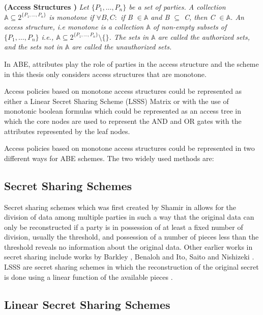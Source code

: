 \begin{definition}{\textbf{(Access Structures \cite{Beimel1996})}}
	\textit{Let $\{P_{1},\ldots,P_{n}\}$ be a set of parties. A collection $ \mathbb{A} \subseteq 2^{\{P_{1},\ldots,P_{n}\}} $ is monotone if $ \forall B,C\colon $ if B $ \in \mathbb{A} $ and B $ \subseteq $ C, then C $ \in \mathbb{A} $. An access structure, i.e monotone is a collection $ \mathbb{A} $ of non-empty subsets of $\{P_{1},\ldots,P_{n}\}$ i.e., $ \mathbb{A} \subseteq 2^{\{P_{1},\ldots,P_{n}\}}\setminus\{\} $. The sets in $ \mathbb{A} $ are called the authorized sets, and the sets not in $ \mathbb{A} $ are called the unauthorized sets.}
\end{definition}

In ABE, attributes play the role of parties in the access structure and the scheme in this thesis only considers access structures that are monotone. 

Access policies based on monotone access structures could be represented as either a Linear Secret Sharing Scheme (LSSS) Matrix or with the use of monotonic boolean formulas which could be represented as an access tree in which the core nodes are used to represent the AND and OR gates with the attributes represented by the leaf nodes. 

Access policies based on monotone access structures could be represented in two different ways for ABE schemes. The two widely used methods are:

\subsection{Secret Sharing Schemes}

Secret sharing schemes which was first created by Shamir in \cite{Shamir1979} allows for the division of data among multiple parties in such a way that the original data can only be reconstructed if a party is in possession of at least a fixed number of division, usually the threshold, and possession of a number of pieces less than the threshold reveals no information about the original data. Other earlier works in secret sharing include works by Barkley \cite{Blakley1979}, Benaloh \cite{Benaloh1988} and Ito, Saito and Nishizeki \cite{Ito1989}. LSSS are secret sharing schemes in which the reconstruction of the original secret is done using a linear function of the available pieces \cite{Beimel1996}.

\subsection{Linear Secret Sharing Schemes}

